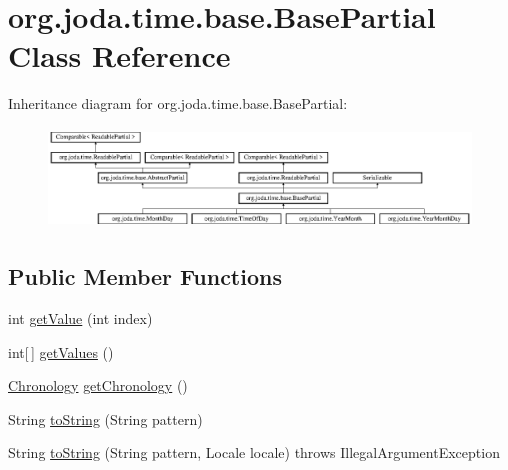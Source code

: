 \hypertarget{classorg_1_1joda_1_1time_1_1base_1_1_base_partial}{\section{org.\-joda.\-time.\-base.\-Base\-Partial Class Reference}
\label{classorg_1_1joda_1_1time_1_1base_1_1_base_partial}
}
Inheritance diagram for org.\-joda.\-time.\-base.\-Base\-Partial\-:\begin{figure}[H]
\begin{center}
\leavevmode
\includegraphics[height=2.654028cm]{classorg_1_1joda_1_1time_1_1base_1_1_base_partial}
\end{center}
\end{figure}
\subsection*{Public Member Functions}
\begin{DoxyCompactItemize}
\item 
int \hyperlink{classorg_1_1joda_1_1time_1_1base_1_1_base_partial_aa04eacdf3f53eec94fe0a89d694d73aa}{get\-Value} (int index)
\item 
int\mbox{[}$\,$\mbox{]} \hyperlink{classorg_1_1joda_1_1time_1_1base_1_1_base_partial_a0c43d4011587d32b8e5e043512c1bb7a}{get\-Values} ()
\item 
\hyperlink{classorg_1_1joda_1_1time_1_1_chronology}{Chronology} \hyperlink{classorg_1_1joda_1_1time_1_1base_1_1_base_partial_af9c9a7e407cb3c976853f14d4050ee7c}{get\-Chronology} ()
\item 
String \hyperlink{classorg_1_1joda_1_1time_1_1base_1_1_base_partial_a0059a1c3caa173f7bfb042847f8e4258}{to\-String} (String pattern)
\item 
String \hyperlink{classorg_1_1joda_1_1time_1_1base_1_1_base_partial_a161d908042a7710e9236b2efa5f58a81}{to\-String} (String pattern, Locale locale)  throws Illegal\-Argument\-Exception 
\end{DoxyCompactItemize}
